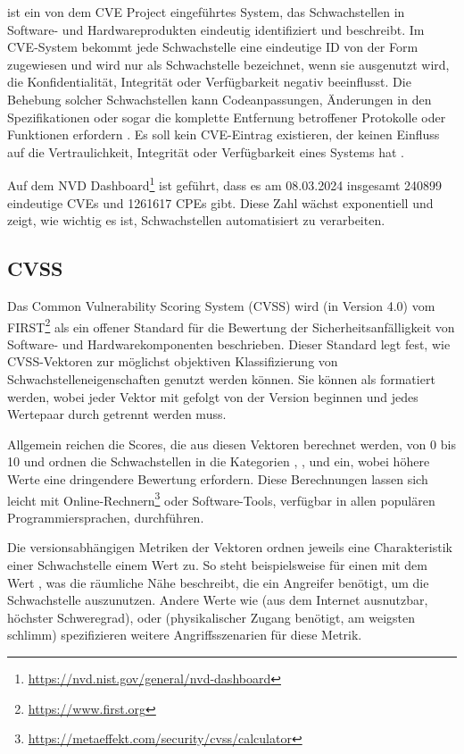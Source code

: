  ist ein von dem CVE Project eingeführtes System, das Schwachstellen in Software- und Hardwareprodukten eindeutig identifiziert und beschreibt.
Im CVE-System bekommt jede Schwachstelle eine eindeutige ID von der Form  zugewiesen und wird nur als Schwachstelle bezeichnet, wenn sie ausgenutzt wird, die Konfidentialität, Integrität oder Verfügbarkeit negativ beeinflusst.
Die Behebung solcher Schwachstellen kann Codeanpassungen, Änderungen in den Spezifikationen oder sogar die komplette Entfernung betroffener Protokolle oder Funktionen erfordern \cite{nvdVulnerabilityDefinition}.
Es soll kein CVE-Eintrag existieren, der keinen Einfluss auf die Vertraulichkeit, Integrität oder Verfügbarkeit eines Systems hat \cite{nvdVulnerabilityMetrics}.

Auf dem NVD Dashboard\footnote{\url{https://nvd.nist.gov/general/nvd-dashboard}} ist geführt, dass es am 08.03.2024 insgesamt 240899 eindeutige CVEs und 1261617 CPEs gibt.
Diese Zahl wächst exponentiell und zeigt, wie wichtig es ist, Schwachstellen automatisiert zu verarbeiten.

\subsection{CVSS} \label{subsec:projektbericht-grundlagen-cvss}

Das Common Vulnerability Scoring System (CVSS) wird (in Version 4.0) \cite{CVSSv4.0Specification} vom FIRST\footnote{\url{https://www.first.org}} als ein offener Standard für die Bewertung der Sicherheitsanfälligkeit von Software- und Hardwarekomponenten beschrieben.
Dieser Standard legt fest, wie CVSS-Vektoren zur möglichst objektiven Klassifizierung von Schwachstelleneigenschaften genutzt werden können.
Sie können als  formatiert werden, wobei jeder Vektor mit  gefolgt von der Version beginnen und jedes Wertepaar durch \qt{/} getrennt werden muss.

Allgemein reichen die Scores, die aus diesen Vektoren berechnet werden, von 0 bis 10 und ordnen die Schwachstellen in die Kategorien , ,  und  ein, wobei höhere Werte eine dringendere Bewertung erfordern.
Diese Berechnungen lassen sich leicht mit Online-Rechnern\footnote{\url{https://metaeffekt.com/security/cvss/calculator}} oder Software-Tools, verfügbar in allen populären Programmiersprachen, durchführen.

Die versionsabhängigen Metriken der Vektoren ordnen jeweils eine Charakteristik einer Schwachstelle einem Wert zu.
So steht beispielsweise  für einen  mit dem Wert , was die räumliche Nähe beschreibt, die ein Angreifer benötigt, um die Schwachstelle auszunutzen.
Andere Werte wie  (aus dem Internet ausnutzbar, höchster Schweregrad),  oder  (physikalischer Zugang benötigt, am weigsten schlimm) spezifizieren weitere Angriffsszenarien für diese Metrik.

